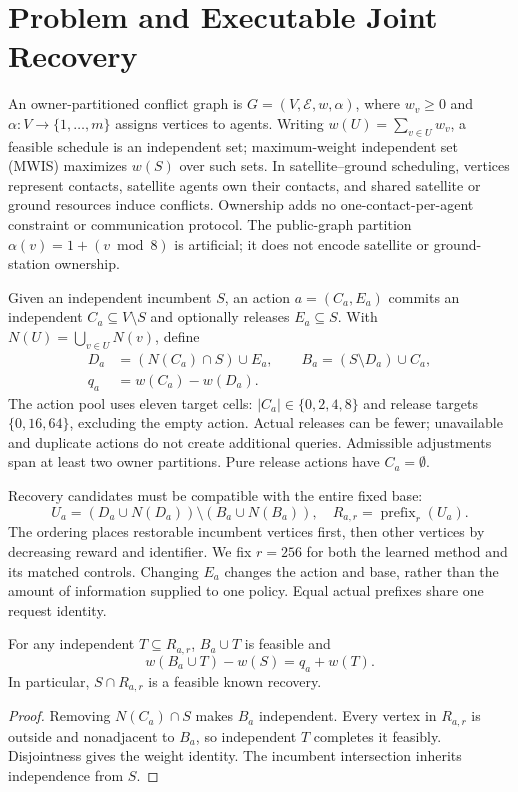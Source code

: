 \section{Problem and Executable Joint Recovery}
\label{sec:problem}

An owner-partitioned conflict graph is $G=(V,\mathcal E,w,\alpha)$,
where $w_v\geq0$ and $\alpha:V\to\{1,\ldots,m\}$ assigns vertices to
agents. Writing $w(U)=\sum_{v\in U}w_v$, a feasible schedule is an
independent set; maximum-weight independent set (MWIS) maximizes $w(S)$
over such sets.
In satellite--ground scheduling, vertices represent contacts, satellite
agents own their contacts, and shared satellite or ground resources induce
conflicts. Ownership adds no one-contact-per-agent constraint or communication
protocol. The public-graph partition $\alpha(v)=1+(v\bmod8)$ is artificial;
it does not encode satellite or ground-station ownership.

Given an independent incumbent $S$, an action $a=(C_a,E_a)$ commits an
independent $C_a\subseteq V\setminus S$ and optionally releases
$E_a\subseteq S$. With $N(U)=\bigcup_{v\in U}N(v)$, define
\begin{align}
 D_a&=(N(C_a)\cap S)\cup E_a,\qquad
 B_a=(S\setminus D_a)\cup C_a,\nonumber\\
 q_a&=w(C_a)-w(D_a).\label{eq:v4-action-base}
\end{align}
The action pool uses eleven target cells:
$|C_a|\in\{0,2,4,8\}$ and release targets $\{0,16,64\}$, excluding
the empty action. Actual releases can be fewer; unavailable and duplicate
actions do not create additional queries. Admissible adjustments span at
least two owner partitions. Pure release actions have $C_a=\emptyset$.

Recovery candidates must be compatible with the entire fixed base:
\begin{equation}
 U_a=(D_a\cup N(D_a))\setminus(B_a\cup N(B_a)),\quad
 R_{a,r}=\operatorname{prefix}_r(U_a).
 \label{eq:v4-recovery-scope}
\end{equation}
The ordering places restorable incumbent vertices first, then other vertices
by decreasing reward and identifier. We fix $r=256$ for both the learned
method and its matched controls. Changing $E_a$ changes the action and base,
rather than the amount of information supplied to one policy. Equal actual
prefixes share one request identity.

\begin{proposition}
\label{prop:v4-recovery-decomposition}
For any independent $T\subseteq R_{a,r}$, $B_a\cup T$ is feasible and
\begin{equation}
 w(B_a\cup T)-w(S)=q_a+w(T).
 \label{eq:v4-realized-decomposition}
\end{equation}
In particular, $S\cap R_{a,r}$ is a feasible known recovery.
\end{proposition}
\begin{proof}
Removing $N(C_a)\cap S$ makes $B_a$ independent. Every vertex in $R_{a,r}$
is outside and nonadjacent to $B_a$, so independent $T$ completes it
feasibly. Disjointness gives the weight identity. The incumbent intersection
inherits independence from $S$.
\end{proof}


